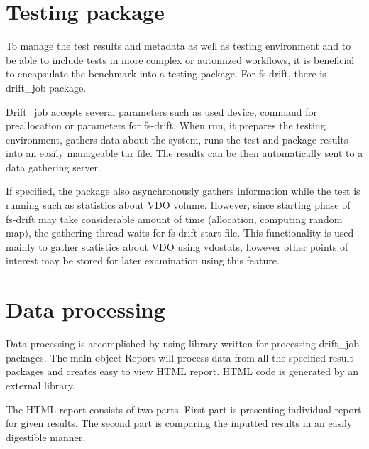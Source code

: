 \documentclass[
  color, %
  table, %
  lof,   %
  lot,   %
]{fithesis3}
\begin{document}
\section{Testing package}
To manage the test results and metadata as well as testing environment and to be able to include tests in more complex or automized workflows, it is beneficial to encapsulate the benchmark into a testing package. For fs-drift, there is drift\_job package.

Drift\_job accepts several parameters such as used device, command for preallocation or parameters for fs-drift. When run, it prepares the testing environment, gathers data about the system, runs the test and package results into an easily manageable tar file. The results can be then automatically sent to a data gathering server.

If specified, the package also asynchronously gathers information while the test is running such as statistics about VDO volume. However, since starting phase of fs-drift may take considerable amount of time (allocation, computing random map), the gathering thread waits for fs-drift start file. This functionality is used mainly to gather statistics about VDO using vdostats, however other points of interest may be stored for later examination using this feature.



\section{Data processing}
Data processing is accomplished by using library written for processing drift\_job packages. The main object Report will process data from all the specified result packages and creates easy to view HTML report. HTML code is generated by an external library. ~\cite{html}

The HTML report consists of two parts. First part is presenting individual report for given results. The second part is comparing the inputted results in an easily digestible manner.
\end{document}
